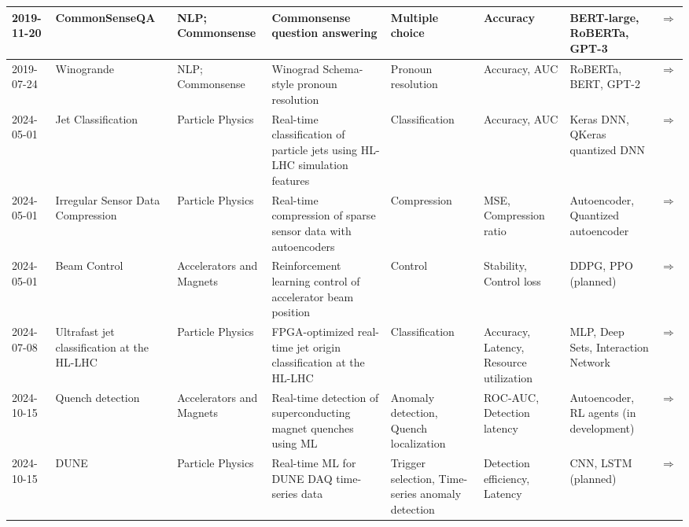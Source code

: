\documentclass{article}
\begin{document}
\begin{landscape}
{\begin{longtable}{|p{1.5cm}|p{2.5cm}|p{2cm}|p{2cm}|p{3cm}|p{2cm}|p{2cm}|p{1cm}|}
2019-11-20 & CommonSenseQA & NLP; Commonsense & Commonsense question answering & Multiple choice & Accuracy & BERT-large, RoBERTa, GPT-3 & \cite{talmor2019commonsenseqaquestionansweringchallenge} \href{https://arxiv.org/abs/1811.00937}{$\Rightarrow$ } \\ \hline
2019-07-24 & Winogrande & NLP; Commonsense & Winograd Schema-style pronoun resolution & Pronoun resolution & Accuracy, AUC & RoBERTa, BERT, GPT-2 & \cite{sakaguchi2019winograndeadversarialwinogradschema} \href{https://arxiv.org/abs/1907.10641}{$\Rightarrow$ } \\ \hline
2024-05-01 & Jet Classification & Particle Physics & Real-time classification of particle jets using HL-LHC simulation features & Classification & Accuracy, AUC & Keras DNN, QKeras quantized DNN & \cite{hawks2022fastml} \href{https://arxiv.org/abs/2207.07958}{$\Rightarrow$ } \\ \hline
2024-05-01 & Irregular Sensor Data Compression & Particle Physics & Real-time compression of sparse sensor data with autoencoders & Compression & MSE, Compression ratio & Autoencoder, Quantized autoencoder & \cite{hawks2022fastml2} \href{https://arxiv.org/abs/2207.07958}{$\Rightarrow$ } \\ \hline
2024-05-01 & Beam Control & Accelerators and Magnets & Reinforcement learning control of accelerator beam position & Control & Stability, Control loss & DDPG, PPO (planned) & \cite{hawks2022fastml3, wang2021booster} \href{https://arxiv.org/abs/2207.07958}{$\Rightarrow$ } \\ \hline
2024-07-08 & Ultrafast jet classification at the HL-LHC & Particle Physics & FPGA-optimized real-time jet origin classification at the HL-LHC & Classification & Accuracy, Latency, Resource utilization & MLP, Deep Sets, Interaction Network &  \href{https://arxiv.org/pdf/2402.01876}{$\Rightarrow$ } \\ \hline
2024-10-15 & Quench detection & Accelerators and Magnets & Real-time detection of superconducting magnet quenches using ML & Anomaly detection, Quench localization & ROC‑AUC, Detection latency & Autoencoder, RL agents (in development) &  \href{https://indico.cern.ch/event/1387540/contributions/6153618/attachments/2948441/5182077/fast_ml_magnets_2024_final.pdf}{$\Rightarrow$ } \\ \hline
2024-10-15 & DUNE & Particle Physics & Real-time ML for DUNE DAQ time-series data & Trigger selection, Time-series anomaly detection & Detection efficiency, Latency & CNN, LSTM (planned) &  \href{https://indico.fnal.gov/event/66520/contributions/301423/attachments/182439/250508/fast_ml_dunedaq_sonic_10_15_24.pdf}{$\Rightarrow$ } \\ \hline

\end{longtable}}
\end{landscape}
\end{document}
